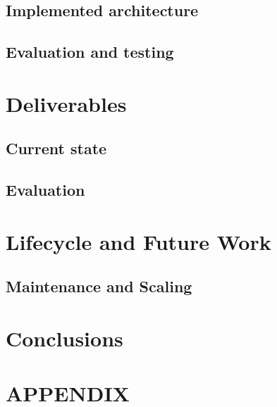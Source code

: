 \documentclass[prodmode,acmtecs]{acmsmall} %
\begin{document}
\subsection{Implemented architecture}

\subsection{Evaluation and testing}

\section{Deliverables}
\subsection{Current state}

\subsection{Evaluation}

\section{Lifecycle and Future Work}
\subsection{Maintenance and Scaling}


\section{Conclusions}


\appendix
\section*{APPENDIX}
\setcounter{section}{1}
\end{document}
